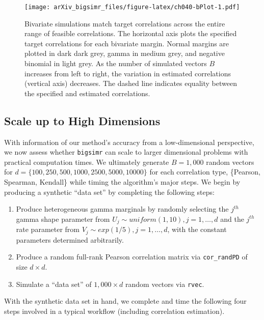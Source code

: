 \documentclass{article}
\begin{document}
\begin{figure}
\centering
\texttt{[image: arXiv\_bigsimr\_files/figure-latex/ch040-bPlot-1.pdf]}
\caption{Bivariate simulations match target correlations across the
entire range of feasible correlations. The horizontal axis plots the
specified target correlations for each bivariate margin. Normal margins
are plotted in dark dark grey, gamma in medium grey, and negative
binomial in light grey. As the number of simulated vectors \(B\)
increases from left to right, the variation in estimated correlations
(vertical axis) decreases. The dashed line indicates equality between
the specified and estimated correlations.}
\end{figure}

\hypertarget{scale-up-to-high-dimensions}{%
\subsection{Scale up to High
Dimensions}\label{scale-up-to-high-dimensions}}

With information of our method's accuracy from a low-dimensional
perspective, we now assess whether \texttt{bigsimr} can scale to larger
dimensional problems with practical computation times. We ultimately
generate \(B=1,000\) random vectors for
\(d=\{100, 250, 500, 1000, 2500, 5000, 10000\}\) for each correlation
type, \{Pearson, Spearman, Kendall\} while timing the algorithm's major
steps. We begin by producing a synthetic ``data set'' by completing the
following steps:

\begin{enumerate}
\def\labelenumi{\arabic{enumi}.}
\tightlist
\item
  Produce heterogeneous gamma marginals by randomly selecting the
  \(j^{th}\) gamma shape parameter from
  \(U_j \sim uniform(1,10), j=1,\ldots,d\) and the \(j^{th}\) rate
  parameter from \(V_j \sim exp(1/5), j=1,\ldots,d\), with the constant
  parameters determined arbitrarily.
\item
  Produce a random full-rank Pearson correlation matrix via
  \texttt{cor\_randPD} of size \(d \times d\).
\item
  Simulate a ``data set'' of \(1,000 \times d\) random vectors via
  \texttt{rvec}.
\end{enumerate}

With the synthetic data set in hand, we complete and time the following
four steps involved in a typical workflow (including correlation
estimation).
\end{document}
